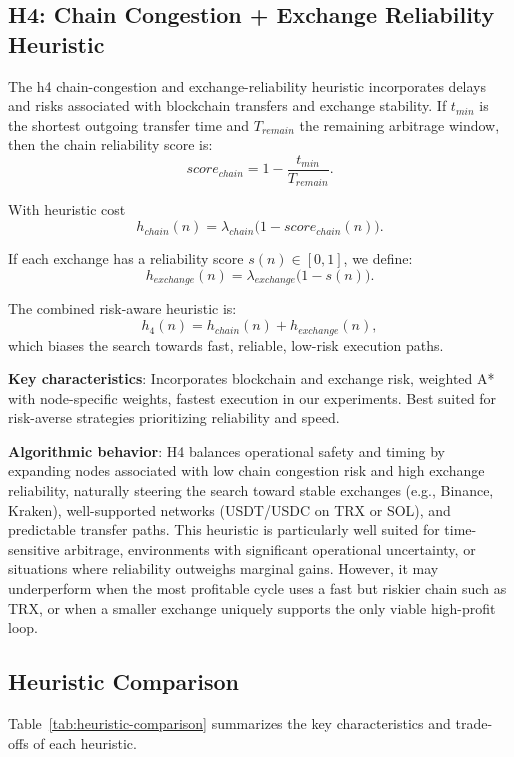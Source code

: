 \documentclass[11pt]{article}
\begin{document}
\subsection{H4: Chain Congestion + Exchange Reliability Heuristic}

The h4 chain-congestion and exchange-reliability heuristic incorporates delays and risks associated with blockchain transfers and exchange stability. If $t_{min}$ is the shortest outgoing transfer time and $T_{remain}$ the remaining arbitrage window, then the chain reliability score is:
\[
\textit{score}_{chain} = 1 - \frac{t_{min}}{T_{remain}}.
\]

With heuristic cost
\[
h_{chain}(n) = \lambda_{chain}\big(1-\textit{score}_{chain}(n)\big).
\]

If each exchange has a reliability score $s(n)\in[0,1]$, we define:
\[
h_{exchange}(n) = \lambda_{exchange}\big(1-s(n)\big).
\]

The combined risk-aware heuristic is:
\[
h_4(n) = h_{chain}(n) + h_{exchange}(n),
\]
which biases the search towards fast, reliable, low-risk execution paths.

\textbf{Key characteristics}: Incorporates blockchain and exchange risk, weighted A* with node-specific weights, fastest execution in our experiments. Best suited for risk-averse strategies prioritizing reliability and speed.

\textbf{Algorithmic behavior}: H4 balances operational safety and timing by expanding nodes associated with low chain congestion risk and high exchange reliability, naturally steering the search toward stable exchanges (e.g., Binance, Kraken), well-supported networks (USDT/USDC on TRX or SOL), and predictable transfer paths. This heuristic is particularly well suited for time-sensitive arbitrage, environments with significant operational uncertainty, or situations where reliability outweighs marginal gains. However, it may underperform when the most profitable cycle uses a fast but riskier chain such as TRX, or when a smaller exchange uniquely supports the only viable high-profit loop.

\subsection{Heuristic Comparison}

Table~\ref{tab:heuristic-comparison} summarizes the key characteristics and trade-offs of each heuristic.
\end{document}
